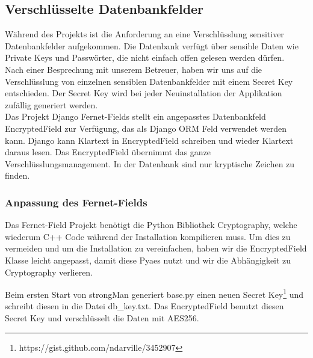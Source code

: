 \subsection{Verschlüsselte Datenbankfelder}
Während des Projekts ist die Anforderung an eine Verschlüsslung sensitiver Datenbankfelder aufgekommen. Die Datenbank verfügt über sensible Daten wie Private Keys und Passwörter, die nicht einfach offen gelesen werden dürfen.\\


Nach einer Besprechung mit unserem Betreuer, haben wir uns auf die Verschlüsslung von einzelnen sensiblen Datenbankfelder mit einem Secret Key entschieden. Der Secret Key wird bei jeder Neuinstallation der Applikation zufällig generiert werden.\\
Das Projekt  Django Fernet-Fields \cite{fernet-fields} stellt ein angepasstes Datenbankfeld EncryptedField zur Verfügung, das als Django ORM Feld verwendet werden kann. Django kann Klartext in EncryptedField schreiben und wieder Klartext daraus lesen. Das EncryptedField übernimmt das ganze Verschlüsslungsmanagement. In der Datenbank sind nur kryptische Zeichen zu finden.

\subsubsection{Anpassung des Fernet-Fields}
Das Fernet-Field Projekt benötigt die Python Bibliothek Cryptography, welche wiederum C++ Code während der Installation kompilieren muss. Um dies zu vermeiden und um die Installation zu vereinfachen, haben wir die EncryptedField Klasse leicht angepasst, damit diese Pyaes nutzt und wir die Abhängigkeit zu Cryptography verlieren.

Beim ersten Start von strongMan generiert base.py einen neuen Secret Key\footnote{https://gist.github.com/ndarville/3452907} und schreibt diesen in die Datei db\_key.txt. Das EncryptedField benutzt diesen Secret Key und verschlüsselt die Daten mit AES256.
